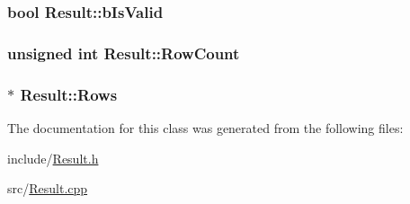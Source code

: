 \subsubsection[{b\+Is\+Valid}]{\setlength{\rightskip}{0pt plus 5cm}bool Result\+::b\+Is\+Valid\hspace{0.3cm}{\ttfamily [protected]}}\label{class_result_acfc4ae3c85dc1af5f56667dfbf34ab45}
\hypertarget{class_result_a2ddeda17e557ee6025523df84e14f701}{}
\subsubsection[{Row\+Count}]{\setlength{\rightskip}{0pt plus 5cm}unsigned int Result\+::\+Row\+Count\hspace{0.3cm}{\ttfamily [protected]}}\label{class_result_a2ddeda17e557ee6025523df84e14f701}
\hypertarget{class_result_af65d0dbe733d624b6464c022de04a504}{}
\subsubsection[{Rows}]{$\ast$ Result\+::\+Rows\hspace{0.3cm}{\ttfamily [protected]}}\label{class_result_af65d0dbe733d624b6464c022de04a504}


The documentation for this class was generated from the following files\+:\begin{DoxyCompactItemize}
\item 
include/\hyperlink{_result_8h}{Result.\+h}\item 
src/\hyperlink{_result_8cpp}{Result.\+cpp}\end{DoxyCompactItemize}
